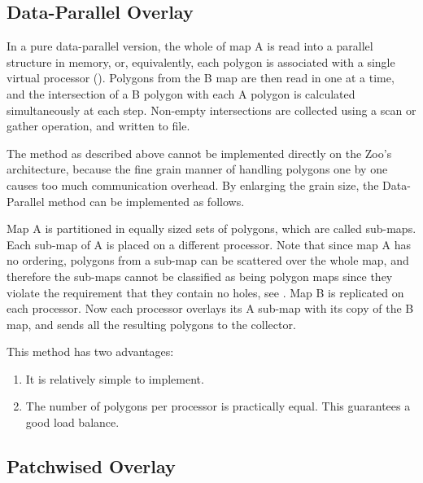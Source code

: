 \subsection{Data-Parallel Overlay}

In a pure data-parallel version, the whole of map A is
read into a parallel structure in memory, or, equivalently,
each polygon is associated with a single virtual processor
().
Polygons from the B map are then read in one at a time,
and the intersection of a B polygon with each A polygon is
calculated simultaneously at each step.
Non-empty intersections are collected using a scan or gather
operation, and written to file.

\begin{figure}[hbtp]
  \begin{centering}
    \hspace{0cm}
  \end{centering}
\end{figure}

The method as described above cannot be implemented directly on the Zoo's
architecture, because the fine grain manner of handling polygons one by
one causes too much communication overhead.
By enlarging the grain size, the Data-Parallel method can be
implemented as follows.

Map A is partitioned in equally sized sets of polygons,
which are called sub-maps.
Each sub-map of A is placed on a different processor.
Note that since map A has no ordering,
polygons from a sub-map can be scattered over the whole map, and
therefore the sub-maps cannot be classified as being polygon maps
since they violate the requirement that they contain no holes, see
.
Map B is replicated on each processor.
Now each processor overlays its A sub-map with its
copy of the B map, and sends all the resulting polygons to the
collector.

This method has two advantages:
\begin{enumerate}
  \item
    It is relatively simple to implement.
  \item
    The number of polygons per processor is practically equal.
    This guarantees a good load balance.
\end{enumerate}



\subsection{Patchwised Overlay}

